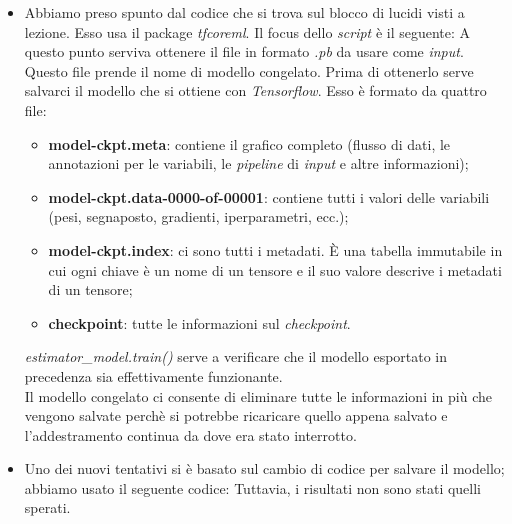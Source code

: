 \begin{itemize}
	\item Abbiamo preso spunto dal codice che si trova sul blocco di lucidi visti a lezione. Esso usa il package \textit{tfcoreml}. Il focus dello \textit{script} è il seguente:
	\vspace*{2ex}
	\vspace*{2ex}
	A questo punto serviva ottenere il file in formato \textit{.pb} da usare come \textit{input}. Questo file prende il nome di modello congelato. Prima di ottenerlo serve salvarci il modello che si ottiene con \textit{Tensorflow}. Esso è formato da quattro file:
	\begin{itemize}
		\item \textbf{model-ckpt.meta}: contiene il grafico completo (flusso di dati, le annotazioni per le variabili, le \textit{pipeline} di \textit{input} e altre informazioni);
     	\item \textbf{model-ckpt.data-0000-of-00001}: contiene tutti i valori delle variabili (pesi, segnaposto, gradienti, iperparametri, ecc.);
     	\item \textbf{model-ckpt.index}: ci sono tutti i metadati. È una tabella immutabile in cui ogni chiave è un nome di un tensore e il suo valore descrive i metadati di un tensore;
     	\item \textbf{checkpoint}: tutte le informazioni sul \textit{checkpoint}.
	\end{itemize}
	\vspace*{2ex}
	\vspace*{2ex}
	\textit{estimator\_model.train()} serve a verificare che il modello esportato in precedenza sia effettivamente funzionante.\\
	\newline
	Il modello congelato ci consente di eliminare tutte le informazioni in più che vengono salvate perchè si potrebbe ricaricare quello appena salvato e l'addestramento continua da dove era stato interrotto.
	\vspace*{2ex}
	\vspace*{2ex}
	\item Uno dei nuovi tentativi si è basato sul cambio di codice per salvare il modello; abbiamo usato il seguente codice:
	\vspace*{2ex}
	\vspace*{2ex}
	Tuttavia, i risultati non sono stati quelli sperati.
	

\end{itemize}
